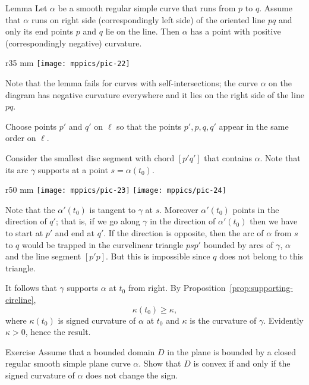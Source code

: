 \begin{thm}{Lemma}\label{lem:lens}
Let $\alpha$ be a smooth regular simple curve that runs from $p$ to $q$.
Assume that $\alpha$ runs on right side (correspondingly left side) of the oriented line $pq$ and only its end points $p$ and $q$ lie on the line.
Then $\alpha$ has a point with positive  (correspondingly negative) curvature.
\end{thm}

\begin{wrapfigure}{r}{35 mm}
\vskip-4mm
\centering
\texttt{[image: mppics/pic-22]}
\vskip0mm
\end{wrapfigure}

Note that the lemma fails for curves with self-intersections;
the curve $\alpha$ on the diagram has negative curvature everywhere and it lies on the right side of the line $pq$. 

Choose points $p'$ and $q'$ on $\ell$
so that the points $p', p, q, q'$ appear in the same order on $\ell$.

Consider the smallest disc segment with chord $[p'q']$ that contains $\alpha$.
Note that its arc $\gamma$ supports at a point $s=\alpha(t_0)$.

\begin{wrapfigure}{r}{50 mm}
\centering
\texttt{[image: mppics/pic-23]}
\bigskip
\texttt{[image: mppics/pic-24]}
\vskip0mm
\end{wrapfigure}
Note that the $\alpha'(t_0)$ is tangent to $\gamma$ at $s$.
Moreover $\alpha'(t_0)$ points in the direction of $q'$;
that is, if we go along $\gamma$ in the direction  of $\alpha'(t_0)$ then we have to start at $p'$ and end at $q'$.
If the direction is opposite, then the arc of $\alpha$ from $s$ to $q$ would be trapped in the curvelinear triangle $psp'$ bounded by arcs of $\gamma$, $\alpha$ and the line segment $[p'p]$.
But this is impossible since $q$ does not belong to this triangle.

It follows that $\gamma$ supports $\alpha$ at $t_0$ from right.
By Proposition~\ref{prop:supporting-circline}, 
\[\kappa(t_0)\ge \kappa,\]
where $\kappa(t_0)$ is signed curvature of $\alpha$ at $t_0$ and $\kappa$ is the curvature of $\gamma$.
Evidently $\kappa>0$, hence the result.
\qeds

\begin{thm}{Exercise}
Assume that a bounded domain $D$ in the plane is bounded by a closed regular smooth simple plane curve $\alpha$.
Show that $D$ is convex if and only if the signed curvature of $\alpha$ does not change the sign.
\end{thm}









